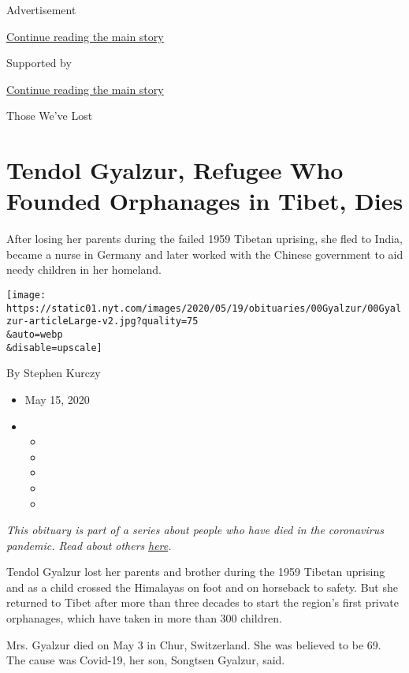 Advertisement

\protect\hyperlink{after-top}{Continue reading the main story}

Supported by

\protect\hyperlink{after-sponsor}{Continue reading the main story}

Those We've Lost

\hypertarget{tendol-gyalzur-refugee-who-founded-orphanages-in-tibet-dies}{%
\section{Tendol Gyalzur, Refugee Who Founded Orphanages in Tibet,
Dies}\label{tendol-gyalzur-refugee-who-founded-orphanages-in-tibet-dies}}

After losing her parents during the failed 1959 Tibetan uprising, she
fled to India, became a nurse in Germany and later worked with the
Chinese government to aid needy children in her homeland.

\texttt{[image: https://static01.nyt.com/images/2020/05/19/obituaries/00Gyalzur/00Gyalzur-articleLarge-v2.jpg?quality=75\\\&auto=webp\\\&disable=upscale]}

By Stephen Kurczy

\begin{itemize}
\item
  May 15, 2020
\item
  \begin{itemize}
  \item
  \item
  \item
  \item
  \item
  \end{itemize}
\end{itemize}

\emph{This obituary is part of a series about people who have died in
the coronavirus pandemic. Read about others}
\href{https://www.nytimes.com/series/people-who-have-died-of-the-coronavirus}{\emph{here}}\emph{.}

Tendol Gyalzur lost her parents and brother during the 1959 Tibetan
uprising and as a child crossed the Himalayas on foot and on horseback
to safety. But she returned to Tibet after more than three decades to
start the region's first private orphanages, which have taken in more
than 300 children.

Mrs. Gyalzur died on May 3 in Chur, Switzerland. She was believed to be
69. The cause was Covid-19, her son, Songtsen Gyalzur, said.

